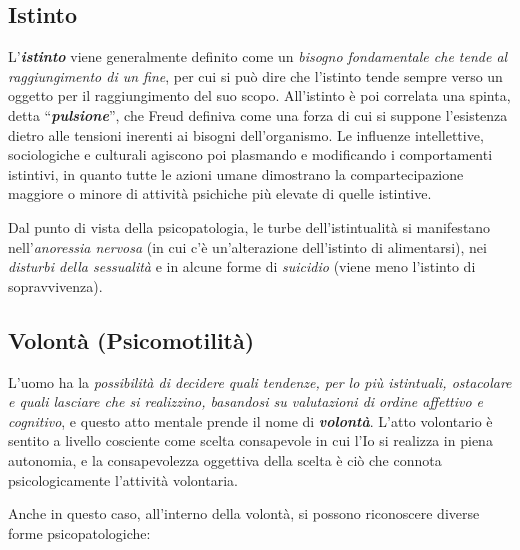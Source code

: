 \subsection{Istinto}

L'\textbf{\emph{istinto}} viene generalmente definito come un
\emph{bisogno fondamentale che tende al raggiungimento di un fine}, per
cui si può dire che l'istinto tende sempre verso un oggetto per il
raggiungimento del suo scopo. All'istinto è poi correlata una spinta,
detta ``\textbf{\emph{pulsione}}'', che Freud definiva come una forza di
cui si suppone l'esistenza dietro alle tensioni inerenti ai bisogni
dell'organismo. Le influenze intellettive, sociologiche e culturali
agiscono poi plasmando e modificando i comportamenti istintivi, in
quanto tutte le azioni umane dimostrano la compartecipazione maggiore o
minore di attività psichiche più elevate di quelle istintive.

Dal punto di vista della psicopatologia, le turbe dell'istintualità si
manifestano nell'\emph{anoressia nervosa} (in cui c'è un'alterazione
dell'istinto di alimentarsi), nei \emph{disturbi della sessualità} e in
alcune forme di \emph{suicidio} (viene meno l'istinto di sopravvivenza).

\subsection{Volontà (Psicomotilità)}

L'uomo ha la \emph{possibilità di decidere quali tendenze, per lo più
istintuali, ostacolare e quali lasciare che si realizzino, basandosi su
valutazioni di ordine affettivo e cognitivo}, e questo atto mentale
prende il nome di \textbf{\emph{volontà}}. L'atto volontario è sentito a
livello cosciente come scelta consapevole in cui l'Io si realizza in
piena autonomia, e la consapevolezza oggettiva della scelta è ciò che
connota psicologicamente l'attività volontaria.

Anche in questo caso, all'interno della volontà, si possono riconoscere
diverse forme psicopatologiche:

